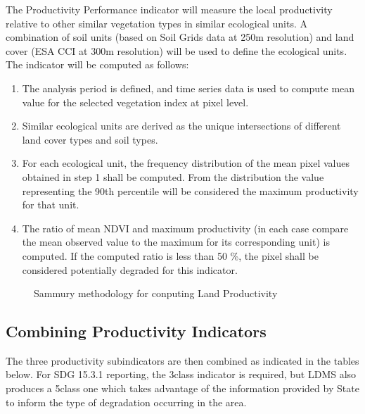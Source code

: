 \documentclass[letterpaper,10pt,english]{sphinxmanual}
\let\sphinxpxdimen\pdfpxdimen\else\newdimen\sphinxpxdimen
\begin{document}
\sphinxAtStartPar
The Productivity Performance indicator will measure the local productivity relative to other similar vegetation types in similar ecological units. A combination of soil units (based on Soil Grids data at 250m resolution) and land cover (ESA CCI at 300m resolution) will be used to define the ecological units. The indicator will be computed as follows:
\begin{enumerate}
%
\item {} 
\sphinxAtStartPar
The analysis period is defined, and time series data is used to compute mean value for the selected vegetation index at pixel level.

\item {} 
\sphinxAtStartPar
Similar ecological units are derived as the unique intersections of different land cover types and soil types.

\item {} 
\sphinxAtStartPar
For each ecological unit, the frequency distribution of the mean pixel values obtained in step 1 shall be computed. From the distribution the value representing the 90th percentile will be considered the maximum productivity for that unit.

\item {} 
\sphinxAtStartPar
The ratio of mean NDVI and maximum productivity (in each case compare the mean observed value to the maximum for its corresponding unit) is computed. If the computed ratio is less than 50 \%, the pixel shall be considered potentially degraded for this indicator.

\end{enumerate}

\begin{figure}[H]
\centering
\capstart

\noindent\sphinxincludegraphics[width=700\sphinxpxdimen,height=500\sphinxpxdimen]{{sdgmethodology}.png}
\caption{Sammury methodology for conputing Land Productivity}\label{\detokenize{Background/SDG_indicators:id3}}\end{figure}


\subsection{Combining Productivity Indicators}
\label{\detokenize{Background/SDG_indicators:combining-productivity-indicators}}
\sphinxAtStartPar
The three productivity sub\sphinxhyphen{}indicators are then combined as indicated in the
tables below. For SDG 15.3.1 reporting, the 3\sphinxhyphen{}class indicator is required, but
LDMS also produces a 5\sphinxhyphen{}class one which takes advantage of the
information provided by State to inform the type of degradation occurring in
the area.
\end{document}
